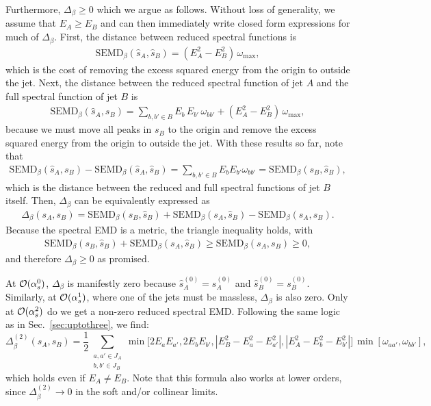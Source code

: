 \documentclass[letterpaper,11pt]{article}
\DeclareRobustCommand{\Sec}[1]{Sec.~\ref{#1}}
\begin{document}
Furthermore, $\Delta_\beta \geq 0$ which we argue as follows.
%
Without loss of generality, we assume that $E_A \geq E_B$ and can then immediately write closed form expressions for much of $\Delta_\beta$.
%
First, the distance between reduced spectral functions is
%
\begin{align}
\text{SEMD}_\beta(\hat{s}_A, \hat{s}_B) = (E_A^2-E_B^2)\, \omega_{\max}, 
\end{align}
%
which is the cost of removing the excess squared energy from the origin to outside the jet.
%
Next, the distance between the reduced spectral function of jet $A$ and the full spectral function of jet $B$ is
%
\begin{align}
\text{SEMD}_\beta(\hat{s}_A, s_B) = \sum_{b,b'\in B} E_b \, E_{b'} \, \omega_{bb'} + (E_A^2-E_B^2) \, \omega_{\max},
\end{align}
%
because we must move all peaks in $s_B$ to the origin and remove the excess squared energy from the origin to outside the jet.
%
With these results so far, note that 
%
\begin{align}
\text{SEMD}_\beta(\hat{s}_A, s_B)-\text{SEMD}_\beta(\hat{s}_A, \hat{s}_B)  = \sum_{b,b'\in B}E_b E_{b'}\omega_{bb'} = \text{SEMD}_\beta(s_B,\hat{s}_B),
\end{align}
%
which is the distance between the reduced and full spectral functions of jet $B$ itself.
%
Then, $\Delta_\beta$ can be equivalently expressed as
%
\begin{align}
\Delta_\beta(s_A, s_B) =\text{SEMD}_\beta(s_B,\hat{s}_B) + \text{SEMD}_\beta(s_A, \hat{s}_B) - \text{SEMD}_\beta(s_A, s_B).
\end{align}
%
Because the spectral EMD is a metric, the triangle inequality holds, with
%
\begin{align}
\text{SEMD}_\beta(s_B,\hat{s}_B) + \text{SEMD}_\beta(s_A, \hat{s}_B) \geq \text{SEMD}_\beta(s_A, s_B) \geq 0,
\end{align}
%
and therefore $\Delta_\beta \geq 0$ as promised.


At ${\cal O}(\alpha_s^0)$, $\Delta_\beta$ is manifestly zero because $\hat{s}^{(0)}_A = s^{(0)}_A$ and $\hat{s}^{(0)}_B = s^{(0)}_B$.
%
Similarly, at  ${\cal O}(\alpha_s^1)$, where one of the jets must be massless, $\Delta_\beta$ is also zero.
%
Only at ${\cal O}(\alpha_s^2)$ do we get a non-zero reduced spectral EMD.
%
Following the same logic as in \Sec{sec:uptothree}, we find:
%
\begin{equation}
\label{eq:delta2}
\Delta^{(2)}_\beta(s_A, s_B) = \frac{1}{2}\sum_{\substack{a,a'\in J_A \\b,b'\in J_B}} \min\big[2E_a E_{a'}, 2 E_b E_{b'}, |E_B^2 - E_a^2 - E_{a'}^2|, |E_A^2 - E_b^2 - E^2_{b'}|\big] \, \min[\omega_{aa'},\omega_{bb'}],
\end{equation}
%
which holds even if $E_A \not= E_B$.
%
Note that this formula also works at lower orders, since $\Delta^{(2)}_\beta \to 0$ in the soft and/or collinear limits.
\end{document}
